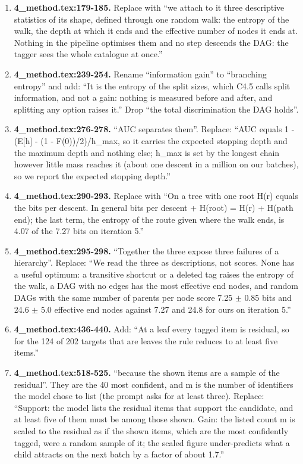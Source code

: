 \documentclass[10pt,a4paper]{article}
\begin{document}
{\begin{enumerate}[leftmargin=1.8em,itemsep=0.45em]
\item \textbf{4\_method.tex:179-185.} Replace with ``we attach to it three descriptive statistics of its shape, defined through one random walk: the entropy of the walk, the depth at which it ends and the effective number of nodes it ends at. Nothing in the pipeline optimises them and no step descends the DAG: the tagger sees the whole catalogue at once.''
\item \textbf{4\_method.tex:239-254.} Rename ``information gain'' to ``branching entropy'' and add: ``It is the entropy of the split sizes, which C4.5 calls split information, and not a gain: nothing is measured before and after, and splitting any option raises it.'' Drop ``the total discrimination the DAG holds''.
\item \textbf{4\_method.tex:276-278.} ``AUC separates them''. Replace: ``AUC equals 1 - (E[h] - (1 - F(0))/2)/h\_max, so it carries the expected stopping depth and the maximum depth and nothing else; h\_max is set by the longest chain however little mass reaches it (about one descent in a million on our batches), so we report the expected stopping depth.''
\item \textbf{4\_method.tex:290-293.} Replace with ``On a tree with one root H(r) equals the bits per descent. In general bits per descent + H(root) = H(r) + H(path \textbar{} end); the last term, the entropy of the route given where the walk ends, is 4.07 of the 7.27 bits on iteration 5.''
\item \textbf{4\_method.tex:295-298.} ``Together the three expose three failures of a hierarchy''. Replace: ``We read the three as descriptions, not scores. None has a useful optimum: a transitive shortcut or a deleted tag raises the entropy of the walk, a DAG with no edges has the most effective end nodes, and random DAGs with the same number of parents per node score 7.25 $\pm$ 0.85 bits and 24.6 $\pm$ 5.0 effective end nodes against 7.27 and 24.8 for ours on iteration 5.''
\item \textbf{4\_method.tex:436-440.} Add: ``At a leaf every tagged item is residual, so for the 124 of 202 targets that are leaves the rule reduces to at least five items.''
\item \textbf{4\_method.tex:518-525.} ``because the shown items are a sample of the residual''. They are the 40 most confident, and m is the number of identifiers the model chose to list (the prompt asks for at least three). Replace: ``Support: the model lists the residual items that support the candidate, and at least five of them must be among those shown. Gain: the listed count m is scaled to the residual as if the shown items, which are the most confidently tagged, were a random sample of it; the scaled figure under-predicts what a child attracts on the next batch by a factor of about 1.7.''

\end{enumerate}}
\end{document}
